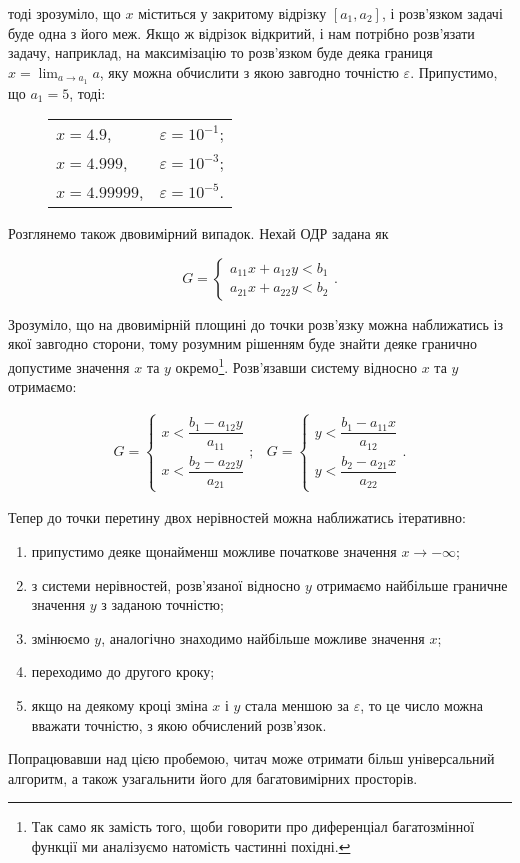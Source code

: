 \documentclass[\main/book.tex]{subfiles}
\begin{document}
тоді зрозуміло, що $x$ міститься у закритому відрізку $[a_1, a_2]$, і розв'язком задачі буде одна з його меж. Якщо ж відрізок відкритий, і нам потрібно розв'язати задачу, наприклад, на максимізацію то розв'язком буде деяка границя $x = \displaystyle \lim_{a \to a_1} a$, яку можна обчислити з якою завгодно точністю $\varepsilon$. Припустимо, що $a_1 = 5$, тоді:

\begin{figure}[!h]
 \center
 \begin{tabular}{ll}
  $x = 4.9$,     & $\varepsilon = 10^{-1}$; \\
  $x = 4.999$,   & $\varepsilon = 10^{-3}$; \\
  $x = 4.99999$, & $\varepsilon = 10^{-5}$.
 \end{tabular}
\end{figure}

Розглянемо також двовимірний випадок. Нехай ОДР задана як

\[
 G = \left\{
  \begin{array}{l}
   a_{11} x + a_{12} y < b_1 \\
   a_{21} x + a_{22} y < b_2
  \end{array}
 \right..
\]

Зрозуміло, що на двовимірній площині до точки розв'язку можна наближатись із якої завгодно сторони, тому розумним рішенням буде знайти деяке гранично допустиме значення $x$ та $y$ окремо\footnote{Так само як замість того, щоби говорити про диференціал багатозмінної функції ми аналізуємо натомість частинні похідні.}. Розв'язавши систему відносно $x$ та $y$ отримаємо:

\[
 \begin{array}{ll}
 G = \left\{
  \begin{array}{l}
   x < \dfrac{b_1 - a_{12} y}{a_{11}} \\
   x < \dfrac{b_2 - a_{22} y}{a_{21}}
  \end{array}
 \right.;
 &
 G = \left\{
  \begin{array}{l}
   y < \dfrac{b_1 - a_{11} x}{a_{12}} \\
   y < \dfrac{b_2 - a_{21} x}{a_{22}}
  \end{array}
 \right..
 \end{array}
\]

Тепер до точки перетину двох нерівностей можна наближатись ітеративно:

\begin{enumerate}
 \item припустимо деяке щонайменш можливе початкове значення ${x \to -\infty}$;
 \item з системи нерівностей, розв'язаної відносно $y$ отримаємо найбільше граничне значення $y$ з заданою точністю;
 \item змінюємо $y$, аналогічно знаходимо найбільше можливе значення $x$;
 \item переходимо до другого кроку;
 \item якщо на деякому кроці зміна $x$ і $y$ стала меншою за $\varepsilon$, то це число можна вважати точністю, з якою обчислений розв'язок.
\end{enumerate}

Попрацювавши над цією пробемою, читач може отримати більш універсальний алгоритм, а також узагальнити його для багатовимірних просторів.
\end{document}
